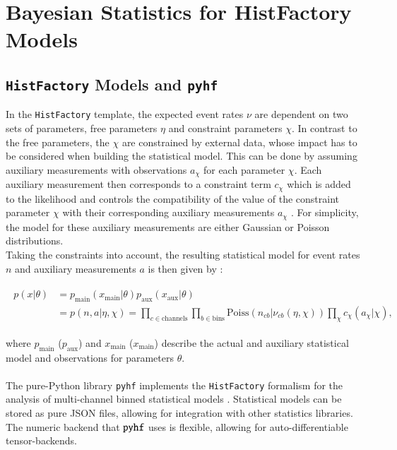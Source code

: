 \section{Bayesian Statistics for HistFactory Models} \label{BayesForpyhf}


\subsection{\texttt{HistFactory} Models and \texttt{pyhf}} \label{subsec:HFandpyhf}

In the \texttt{HistFactory} template, the expected event rates $\nu$ are dependent on two sets of parameters, free parameters $\eta$ and constraint parameters $\chi$. In contrast to the free parameters, the $\chi$ are constrained by external data, whose impact has to be considered when building the statistical model. This can be done by assuming auxiliary measurements with observations $a_{\chi}$ for each parameter $\chi$. Each auxiliary measurement then corresponds to a constraint term  $c_{\chi}$ which is added to the likelihood and controls the compatibility of the value of the constraint parameter $\chi$ with their corresponding auxiliary measurements $a_{\chi}$ \cite{pyhf, pyhf_joss, Cranmer:1456844}. For simplicity, the model for these auxiliary measurements are either Gaussian or Poisson distributions. \\
Taking the constraints into account, the resulting statistical model for event rates $n$ and auxiliary measurements $a$ is then given by \cite{pyhf, pyhf_joss}:

    \begin{align}
    \begin{split}
        p(x | \theta ) &= p_{\text{main}} (x_{\text{main}}| \theta ) p_{\text{aux}} (x_{\text{aux}}| \theta) \\
         &= p( n, a | \eta, \chi) = \prod_{c \in \text{channels}}  \prod_{b \in \text{bins}} \text{Poiss}(n_{cb} | \nu_{cb}(\eta, \chi)) \prod_{\chi}c_{\chi}(a_{\chi} | \chi),
    \end{split}
    \end{align}

\noindent where $p_{\text{main}}$ ($p_{\text{aux}}$) and $x_{\text{main}}$ ($x_{\text{main}}$) describe the actual and auxiliary statistical model and observations for parameters $\theta$. \\ \\
\noindent The pure-Python library \texttt{pyhf} implements the \texttt{HistFactory} formalism for the analysis of multi-channel binned statistical models \cite{pyhf, pyhf_joss}. Statistical models can be stored as pure JSON files, allowing for integration with other statistics libraries. The numeric backend that $\texttt{pyhf}$ uses is flexible, allowing for auto-differentiable tensor-backends.

